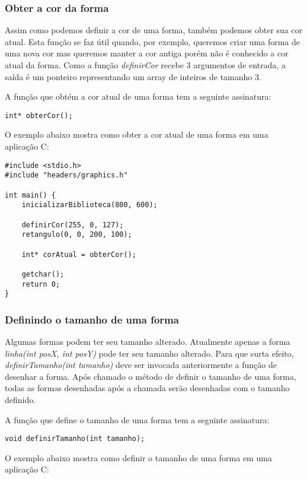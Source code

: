 \documentclass[12pt, %
openright,
oneside, %
a4paper,    %
brazil]{facom-ufu-abntex2}
\begin{document}
\subsubsection{Obter a cor da forma}
Assim como podemos definir a cor de uma forma, também podemos obter sua cor atual. Esta função se faz útil quando, por exemplo, queremos criar uma forma de uma nova cor mas queremos manter a cor antiga porém não é conhecido a cor atual da forma. Como a função \textit{definirCor} recebe 3 argumentos de entrada, a saída é um ponteiro representando um array de inteiros de tamanho 3.

A função que obtém a cor atual de uma forma tem a seguinte assinatura:

\begin{lstlisting}
int* obterCor();
\end{lstlisting}

O exemplo abaixo mostra como obter a cor atual de uma forma em uma aplicação C:

\begin{lstlisting}
#include <stdio.h>
#include "headers/graphics.h"

int main() {
    inicializarBiblioteca(800, 600);

    definirCor(255, 0, 127);
    retangulo(0, 0, 200, 100);

    int* corAtual = obterCor();

    getchar();
    return 0;
}
\end{lstlisting}

\subsubsection{Definindo o tamanho de uma forma}
Algumas formas podem ter seu tamanho alterado. Atualmente apenas a forma \textit{linha(int posX, int posY)} pode ter seu tamanho alterado. Para que surta efeito, \textit{definirTamanho(int tamanho)} deve ser invocada anteriormente a função de desenhar a forma. Após chamado o método de definir o tamanho de uma forma, todas as formas desenhadas após a chamada serão desenhadas com o tamanho definido.

A função que define o tamanho de uma forma tem a seguinte assinatura:

\begin{lstlisting}
void definirTamanho(int tamanho);
\end{lstlisting}

O exemplo abaixo mostra como definir o tamanho de uma forma em uma aplicação C:
\end{document}
